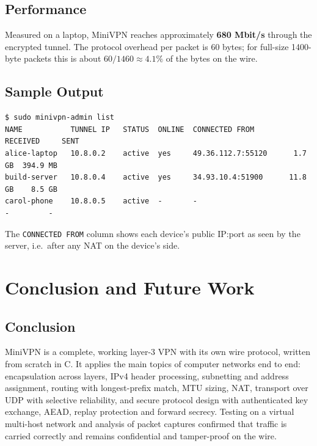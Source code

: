 \documentclass[12pt,a4paper]{report}
\begin{document}

\section{Performance}
Measured on a laptop, MiniVPN reaches approximately \textbf{680 Mbit/s} through the
encrypted tunnel. The protocol overhead per packet is 60 bytes; for full-size 1400-byte
packets this is about $60/1460 \approx 4.1\%$ of the bytes on the wire.

\section{Sample Output}
\begin{lstlisting}[language={},numbers=none,basicstyle=\ttfamily\scriptsize,caption={Device list with public endpoints and traffic}]
$ sudo minivpn-admin list
NAME           TUNNEL IP   STATUS  ONLINE  CONNECTED FROM       RECEIVED     SENT
alice-laptop   10.8.0.2    active  yes     49.36.112.7:55120      1.7 GB  394.9 MB
build-server   10.8.0.4    active  yes     34.93.10.4:51900      11.8 GB    8.5 GB
carol-phone    10.8.0.5    active  -       -                          -         -
\end{lstlisting}
The \texttt{CONNECTED FROM} column shows each device's public IP:port as seen by the
server, i.e.\ after any NAT on the device's side.

\chapter{Conclusion and Future Work}\label{ch:conclusion}

\section{Conclusion}
MiniVPN is a complete, working layer-3 VPN with its own wire protocol, written from
scratch in C. It applies the main topics of computer networks end to end:
encapsulation across layers, IPv4 header processing, subnetting and address
assignment, routing with longest-prefix match, MTU sizing, NAT, transport over UDP with
selective reliability, and secure protocol design with authenticated key exchange,
AEAD, replay protection and forward secrecy. Testing on a virtual multi-host network
and analysis of packet captures confirmed that traffic is carried correctly and
remains confidential and tamper-proof on the wire.
\end{document}
